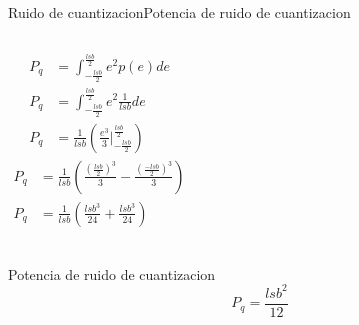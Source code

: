  \begin{frame}{Ruido de cuantizacion}{Potencia de ruido de cuantizacion}
    \begin{columns}[onlytextwidth]
       \begin{align*}
          P_q &= \int^\frac{lsb}{2}_{-\frac{lsb}{2}} e^2 p(e) de \\
          P_q &= \int^\frac{lsb}{2}_{-\frac{lsb}{2}} e^2 \frac{1}{lsb} de \\
          P_q &= \frac{1}{lsb}\left(\frac{e^3}{3} \Big\rvert^{\frac{lsb}{2}}_{-\frac{lsb}{2}}\right)
       \end{align*}
       \begin{align*}
          P_q &= \frac{1}{lsb}\left(\frac{(\frac{lsb}{2})^3}{3} - \frac{(\frac{-lsb}{2})^3}{3}\right)\\
          P_q &= \frac{1}{lsb} \left(\frac{lsb^3}{24} + \frac{lsb^3}{24}\right) \\
       \end{align*}
    \end{columns}
    \begin{block}{Potencia de ruido de cuantizacion}
       \begin{equation}
          P_q = \frac{lsb^2}{12}
       \end{equation}
    \end{block}
    \vfill
 \end{frame}
